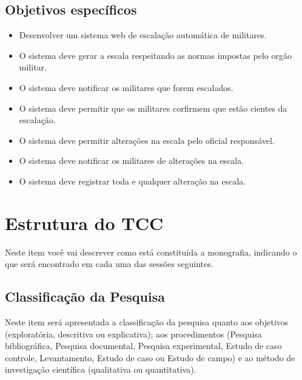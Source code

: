 \subsection{Objetivos específicos}
\begin{itemize}[label=$\bullet$]
    \item Desenvolver um sistema web de escalação automática de militares.
    \item O sistema deve gerar a escala respeitando as normas impostas pelo orgão militar.
    \item O sistema deve notificar os militares que forem escalados.
    \item O sistema deve permitir que os militares corfirmem que estão cientes da escalação.
    \item O sistema deve permitir alterações na escala pelo oficial responsável.
    \item O sistema deve notificar os militares de alterações na escala.
    \item O sistema deve registrar toda e qualquer alteração na escala.
\end{itemize}

\section{Estrutura do TCC}
Neste item você vai descrever como está constituída a monografia, indicando o
que será encontrado em cada uma das sessões seguintes.

\subsection{Classificação da Pesquisa}
Neste item será apresentada a classificação da pesquisa quanto aos objetivos
(exploratória, descritiva ou explicativa); aos procedimentos (Pesquisa
bibliográfica, Pesquisa documental, Pesquisa experimental, Estudo de caso
controle, Levantamento, Estudo de caso ou Estudo de campo) e ao método de
investigação científica (qualitativa ou quantitativa).
